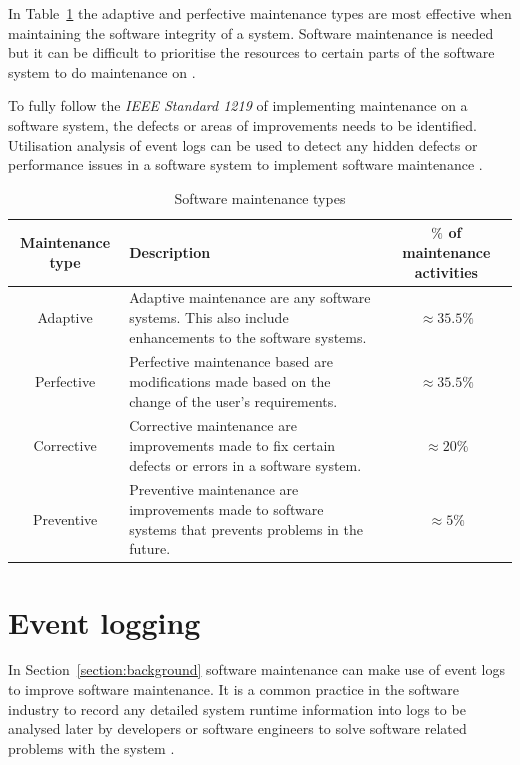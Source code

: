 In Table~\ref{tbl:CH1_MaintenanceTypes} the adaptive and perfective maintenance types are most effective when maintaining the software integrity of a system. Software maintenance is needed but it can be difficult to prioritise the resources to certain parts of the software system to do maintenance on \cite{Mamone1994, Hasan2012}.\par To fully follow the \textit{IEEE Standard 1219} of implementing maintenance on a software system, the defects or areas of improvements needs to be identified. Utilisation analysis of event logs can be used to detect any hidden defects or performance issues in a software system to implement software maintenance \cite{Cinque2013, Rong2018a, Levin2019}.

\clearpage

\begin{table}[!htb]
	\centering
	\small
	\caption{Software maintenance types}
	\label{tbl:CH1_MaintenanceTypes}
	\begin{tabularx}{\textwidth}{|c|X|c|}
		\hline
		\textbf{Maintenance type} & \textbf{Description} & \textbf{$\%$ of maintenance activities} \\ \hline
		Adaptive & \raggedright Adaptive maintenance are any software systems. This also include enhancements to the software systems. & $\approx 35.5\%$ \\ \hline
		Perfective & Perfective maintenance based are modifications made based on the change of the user's requirements. & $\approx 35.5\%$ \\ \hline
		Corrective & \raggedright Corrective maintenance are improvements made to fix certain defects or errors in a software system. & $\approx 20\%$ \\ \hline
		Preventive & \raggedright  Preventive maintenance are improvements made to software systems that prevents problems in the future. & $\approx 5\%$ \\ \hline
	\end{tabularx}
\end{table}

\section{Event logging}
In Section~\ref{section:background} software maintenance can make use of event logs to improve software maintenance. It is a common practice in the software industry to record any detailed system runtime information into logs to be analysed later by developers or software engineers to solve software related problems with the system \cite{Zhu2019}.

